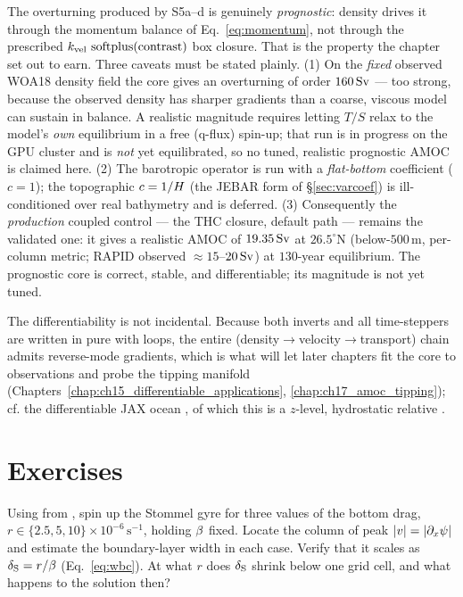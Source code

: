 \begin{remark}
The overturning produced by S5a--d is genuinely \emph{prognostic}: density drives it through the
momentum balance of Eq.~\eqref{eq:momentum}, not through the prescribed
$k_{\mathrm{vel}}\,\operatorname{softplus}(\text{contrast})$ box closure. That is the property the chapter set
out to earn. Three caveats must be stated plainly. (1) On the \emph{fixed} observed WOA18 density
field the core gives an overturning of order $160\,\mathrm{Sv}$ --- too strong, because the observed density
has sharper gradients than a coarse, viscous model can sustain in balance. A realistic magnitude
requires letting $T/S$ relax to the model's \emph{own} equilibrium in a free (q-flux) spin-up;
that run is in progress on the GPU cluster and is \emph{not} yet equilibrated, so no tuned,
realistic prognostic AMOC is claimed here. (2) The barotropic operator is run with a
\emph{flat-bottom} coefficient ($c=1$); the topographic $c=1/H$ (the JEBAR form of
\S\ref{sec:varcoef}) is ill-conditioned over real bathymetry and is deferred. (3) Consequently the
\emph{production} coupled control --- the THC closure, default path --- remains the validated one:
it gives a realistic AMOC of $19.35\,\mathrm{Sv}$ at $26.5^\circ$N (below-$500$\,m, per-column metric;
RAPID observed $\approx15$--$20\,\mathrm{Sv}$) at $130$-year equilibrium. The prognostic core is correct,
stable, and differentiable; its magnitude is not yet tuned.
\end{remark}

The differentiability is not incidental. Because both inverts and all time-steppers are written in
pure \jax{} with  loops, the entire (density$\to$velocity$\to$transport) chain admits
reverse-mode gradients, which is what will let later chapters fit the core to observations and probe
the tipping manifold (Chapters~\ref{chap:ch15_differentiable_applications},
\ref{chap:ch17_amoc_tipping}); cf. the differentiable JAX ocean 
\citep{hafner2018veros}, of which this is a $z$-level, hydrostatic relative
\citep{bryan1969}.

\section*{Exercises}

\begin{exercise}
Using  from ,
spin up the Stommel gyre for three values of the bottom drag, $r\in\{2.5,5,10\}\times10^{-6}\,\mathrm{s^{-1}}$,
holding $\beta$ fixed. Locate the column of peak $|v|=|\partial_x\psi|$ and estimate the boundary-layer
width in each case. Verify that it scales as $\delta_{\mathrm{S}}=r/\beta$ (Eq.~\ref{eq:wbc}). At what $r$ does
$\delta_{\mathrm{S}}$ shrink below one grid cell, and what happens to the solution then?
\end{exercise}

